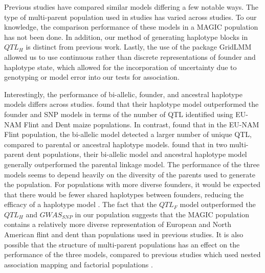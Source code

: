 \documentclass[article,9pt,twocolumn,twoside]{rilabRxiv}
\begin{document}
Previous studies have compared similar models differing a few notable ways.
The type of multi-parent population used in studies has varied across studies. To our knowledge, the comparison performance of these models in a MAGIC population has not been done.
In addition, our method of generating haplotype blocks in $QTL_H$ is distinct from previous work.
Lastly, the use of the package GridLMM \citep{Runcie} allowed us to use continuous rather than discrete representations of founder and haplotype state, which allowed for the incorporation of uncertainty due to genotyping or model error into our tests for association.

Interestingly, the performance of bi-allelic, founder, and ancestral haplotype models differs across studies.
\cite{Giraud} found that their haplotype model outperformed the founder and SNP models in terms of the number of QTL identified using EU-NAM Flint and Dent maize populations.
In contrast, \cite{Garin2} found that in the EU-NAM Flint population, the bi-allelic model detected a larger number of unique QTL, compared to parental or ancestral haplotype models.
\cite{Bardol} found that in two multi-parent dent populations, their bi-allelic model and ancestral haplotype model generally outperformed the parental linkage model.
The performance of the three models seems to depend heavily on the diversity of the parents used to generate the population.
For populations with more diverse founders, it would be expected that there would be fewer shared haplotypes between founders, reducing the efficacy of a haplotype model \citep{Giraud}.
The fact that the $QTL_F$ model outperformed the $QTL_H$ and $GWAS_{SNP}$ in our population suggests that the MAGIC population contains a relatively more diverse representation of European and North American flint and dent than populations used in previous studies.
It is also possible that the structure of multi-parent populations has an effect on the performance of the three models, compared to previous studies which used nested association mapping \citep{Giraud,Garin2} and factorial populations \cite{Bardol}.
\end{document}
